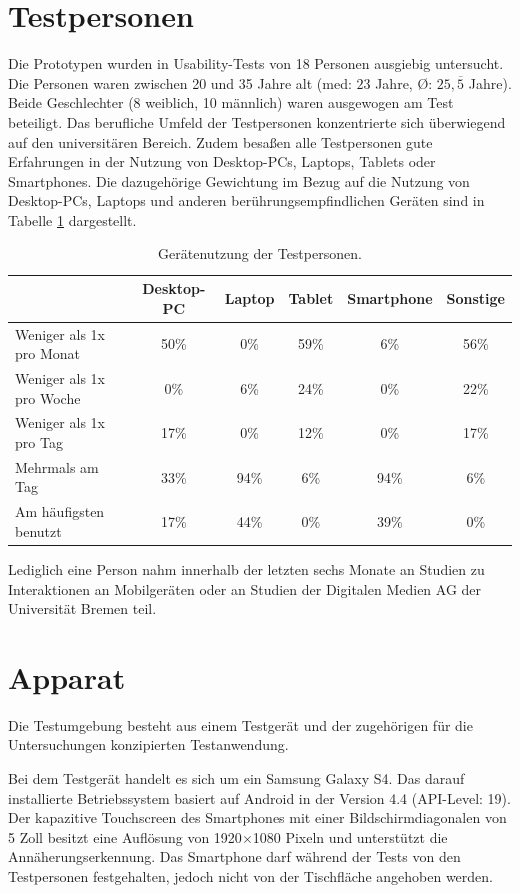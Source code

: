 \documentclass[a4paper,BCOR2mm,12pt,bibliography=totoc,listof=totoc,abstracton]{scrreprt}
\begin{document}
\section{Testpersonen}
Die Prototypen wurden in Usability-Tests von 18 Personen ausgiebig untersucht. Die Personen waren zwischen 20 und 35 Jahre alt (med: $23$ Jahre, \O: $25{,}\overline 5$ Jahre). Beide Geschlechter (8 weiblich, 10 männlich) waren ausgewogen am Test beteiligt. Das berufliche Umfeld der Testpersonen konzentrierte sich überwiegend auf den universitären Bereich. Zudem besaßen alle Testpersonen gute Erfahrungen in der Nutzung von Desktop-PCs, Laptops, Tablets oder Smartphones. Die dazugehörige Gewichtung im Bezug auf die Nutzung von Desktop-PCs, Laptops und anderen berührungsempfindlichen Geräten sind in Tabelle \ref{nutzungtestpersonen} dargestellt.
\begin{table}
\centering
\renewcommand{\arraystretch}{2}
\setlength{\tabcolsep}{4pt}
\begin{tabular}{ p{4.8cm} | c c c c c}
& Desktop-PC & Laptop & Tablet & Smartphone & Sonstige\\\hline
Weniger als 1x pro Monat & 50\% & 0\% & 59\% & 6\% & 56\%\\
Weniger als 1x pro Woche & 0\% & 6\% & 24\% & 0\% & 22\% \\
Weniger als 1x pro Tag & 17\% & 0\% & 12\% & 0\% & 17\% \\
Mehrmals am Tag & 33\% & 94\% & 6\% & 94\% & 6\% \\
\hline
Am häufigsten benutzt & 17\% & 44\% & 0\% & 39\% & 0\% \\
\end{tabular}
\caption{Gerätenutzung der Testpersonen.}
\label{nutzungtestpersonen}
\end{table}
Lediglich eine Person nahm innerhalb der letzten sechs Monate an Studien zu Interaktionen an Mobilgeräten oder an Studien der Digitalen Medien AG der Universität Bremen teil.

\section{Apparat}
Die Testumgebung besteht aus einem Testgerät und der zugehörigen für die Untersuchungen konzipierten Testanwendung.

Bei dem Testgerät handelt es sich um ein Samsung Galaxy S4. Das darauf installierte Betriebssystem basiert auf Android in der Version 4.4 (API-Level: 19). Der kapazitive Touchscreen des Smartphones mit einer Bildschirmdiagonalen von 5 Zoll besitzt eine Auflösung von 1920$\times$1080 Pixeln und unterstützt die Annäherungserkennung. Das Smartphone darf während der Tests von den Testpersonen festgehalten, jedoch nicht von der Tischfläche angehoben werden.
\end{document}
